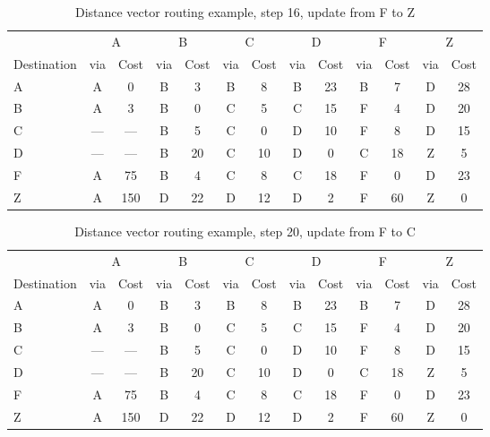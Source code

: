 \begin{table}
    \caption{Distance vector  routing example, step 16, update from F to Z }
    \label{tab:dv:step:16}
\begin{tabular}{l|c|c|c|c|c|c|c|c|c|c|c|c}
    \toprule
      & \multicolumn{2}{c|}{A}&\multicolumn{2}{c|}{B}&\multicolumn{2}{c|}{C}&\multicolumn{2}{c|}{D}&\multicolumn{2}{c|}{F}&\multicolumn{2}{c|}{Z} \\
    Destination & via&Cost&via&Cost&via&Cost&via&Cost&via&Cost&via&Cost \\ 
    \midrule
    A & A & 0 &B & 3 &B & 8 &B & 23 &B & 7 &D & 28 
 \\B & A & 3 &B & 0 &C & 5 &C & 15 &F & 4 &D & 20 
 \\C & --- & ---&B & 5 &C & 0 &D & 10 &F & 8 &D & 15 
 \\D & --- & ---&B & 20 &C & 10 &D & 0 &C & 18 &Z & 5 
 \\F & A & 75 &B & 4 &C & 8 &C & 18 &F & 0 &D & 23 
 \\Z & A & 150 &D & 22 &D & 12 &D & 2 &F & 60 &Z & 0 
    \\ \bottomrule 
\end{tabular}
\end{table}
    

\begin{table}
    \caption{Distance vector  routing example, step 20, update from F to C }
    \label{tab:dv:step:20}
\begin{tabular}{l|c|c|c|c|c|c|c|c|c|c|c|c}
    \toprule
      & \multicolumn{2}{c|}{A}&\multicolumn{2}{c|}{B}&\multicolumn{2}{c|}{C}&\multicolumn{2}{c|}{D}&\multicolumn{2}{c|}{F}&\multicolumn{2}{c|}{Z} \\
    Destination & via&Cost&via&Cost&via&Cost&via&Cost&via&Cost&via&Cost \\ 
    \midrule
    A & A & 0 &B & 3 &B & 8 &B & 23 &B & 7 &D & 28 
 \\B & A & 3 &B & 0 &C & 5 &C & 15 &F & 4 &D & 20 
 \\C & --- & ---&B & 5 &C & 0 &D & 10 &F & 8 &D & 15 
 \\D & --- & ---&B & 20 &C & 10 &D & 0 &C & 18 &Z & 5 
 \\F & A & 75 &B & 4 &C & 8 &C & 18 &F & 0 &D & 23 
 \\Z & A & 150 &D & 22 &D & 12 &D & 2 &F & 60 &Z & 0 
    \\ \bottomrule 
\end{tabular}
\end{table}
    

